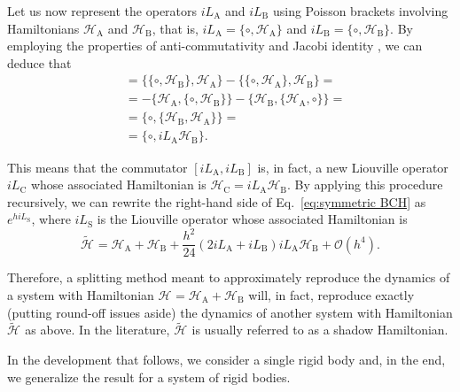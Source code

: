 \documentclass[
journal=jctcce,
layout=twocolumn
]{achemso}
\newcommand{\Ham}[1]{{\mathcal H}_\text{#1}}    %
\newcommand{\Liu}[1]{i\!L_\text{#1}}            %
\newcommand{\timestep}{h}
\newcommand{\refined}[1]{\widetilde{#1}}
\begin{document}
Let us now represent the operators $\Liu A$ and $\Liu B$ using Poisson brackets involving Hamiltonians $\Ham A$ and $\Ham B$, that is, $\Liu A = \{\circ,\Ham A\}$ and $\Liu B = \{\circ,\Ham B\}$.
By employing the properties of anti-commutativity and Jacobi identity \cite{Hairer_2006}, we can deduce that
\begin{align*}
[\Liu A,\Liu B] &= \{\{\circ,\Ham B\},\Ham A\} - \{\{\circ,\Ham A\},\Ham B\} = \\
&= -\{\Ham A,\{\circ,\Ham B\}\} - \{\Ham B,\{\Ham A,\circ\}\} = \\
&= \{\circ,\{\Ham B,\Ham A\}\} = \\
&= \{\circ,{\Liu A} {\Ham B}\}.
\end{align*}

This means that the commutator $[\Liu A,\Liu B]$ is, in fact, a new Liouville operator $\Liu C$ whose associated Hamiltonian is $\Ham C = {\Liu A}{\Ham B}$.
By applying this procedure recursively, we can rewrite the right-hand side of Eq.~\eqref{eq:symmetric BCH} as $e^{\timestep \Liu S}$, where $\Liu S$ is the Liouville operator whose associated Hamiltonian is
\begin{equation*}
\label{eq:general shadow hamiltonian}
\refined{\Ham{}} = \Ham A + \Ham B + \frac{h^2}{24} (2 \Liu A + \Liu B){\Liu A}{\Ham B} + \mathcal{O}(h^4).
\end{equation*}

Therefore, a splitting method meant to approximately reproduce the dynamics of a system with Hamiltonian $\Ham{} = \Ham A + \Ham B$ will, in fact, reproduce exactly (putting round-off issues aside) the dynamics of another system with Hamiltonian $\refined{\Ham{}}$ as above.
In the literature, $\refined{\Ham{}}$ is usually referred to as a shadow Hamiltonian.

In the development that follows, we consider a single rigid body and, in the end, we generalize the result for a system of rigid bodies.
\end{document}
